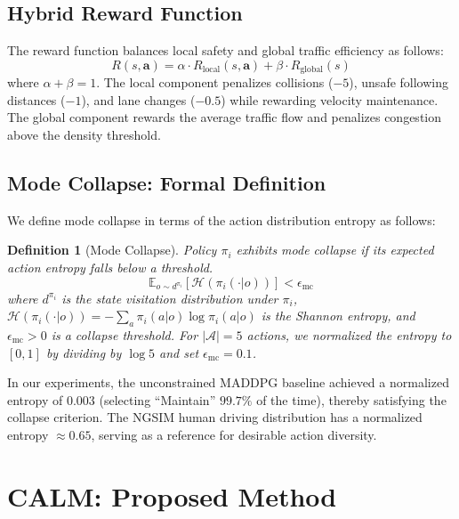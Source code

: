 \documentclass[journal]{IEEEtran}
\newtheorem{definition}{Definition}
\newcommand{\E}{\mathbb{E}}
\newcommand{\cA}{\mathcal{A}}
\begin{document}
\subsection{Hybrid Reward Function}

The reward function balances local safety and global traffic efficiency as follows:
\begin{equation}
    R(s, \bm{a}) = \alpha \cdot R_{\text{local}}(s, \bm{a}) + \beta \cdot R_{\text{global}}(s)
    \label{eq:reward}
\end{equation}
where $\alpha + \beta = 1$. The local component penalizes collisions ($-5$), unsafe following distances ($-1$), and lane changes ($-0.5$) while rewarding velocity maintenance. The global component rewards the average traffic flow and penalizes congestion above the density threshold.

\subsection{Mode Collapse: Formal Definition}

We define mode collapse in terms of the action distribution entropy as follows:

\begin{definition}[Mode Collapse]
\label{def:mode_collapse}
Policy $\pi_i$ exhibits mode collapse if its expected action entropy falls below a threshold.
\begin{equation}
    \E_{o \sim d^{\pi_i}} \left[ \mathcal{H}(\pi_i(\cdot | o)) \right] < \epsilon_{\text{mc}}
\end{equation}
where $d^{\pi_i}$ is the state visitation distribution under $\pi_i$, $\mathcal{H}(\pi_i(\cdot|o)) = -\sum_{a} \pi_i(a|o) \log \pi_i(a|o)$ is the Shannon entropy, and $\epsilon_{\text{mc}} > 0$ is a collapse threshold.
For $|\cA| = 5$ actions, we normalized the entropy to $[0,1]$ by dividing by $\log 5$ and set $\epsilon_{\text{mc}} = 0.1$.
\end{definition}

In our experiments, the unconstrained MADDPG baseline achieved a normalized entropy of $0.003$ (selecting ``Maintain'' $99.7\%$ of the time), thereby satisfying the collapse criterion.
The NGSIM human driving distribution has a normalized entropy $\approx 0.65$, serving as a reference for desirable action diversity.

\section{CALM: Proposed Method}
\label{sec:method}
\end{document}
